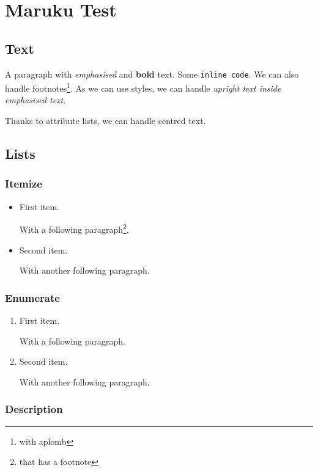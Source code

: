 \documentclass[
  text,
  maruku
]{internet}
\begin{document}
\section{Maruku Test}

\subsection{Text}

A paragraph with \emph{emphasised} and \textbf{bold} text.
Some \verb+inline code+.
We can also handle footnotes\footnote{with aplomb}.
As we can use styles, we can handle \emph{upright \textup{text} inside emphasised text}.
\begin{center}
Thanks to attribute lists, we can handle centred text.
\end{center}

\subsection{Lists}

\subsubsection{Itemize}

\begin{itemize}
\item First item.

With a following paragraph\footnote{that has a footnote}.

\item Second item.

With another following paragraph.
\end{itemize}

\subsubsection{Enumerate}

\begin{enumerate}
\item First item.

With a following paragraph.

\item Second item.

With another following paragraph.
\end{enumerate}

\subsubsection{Description}
\end{document}
